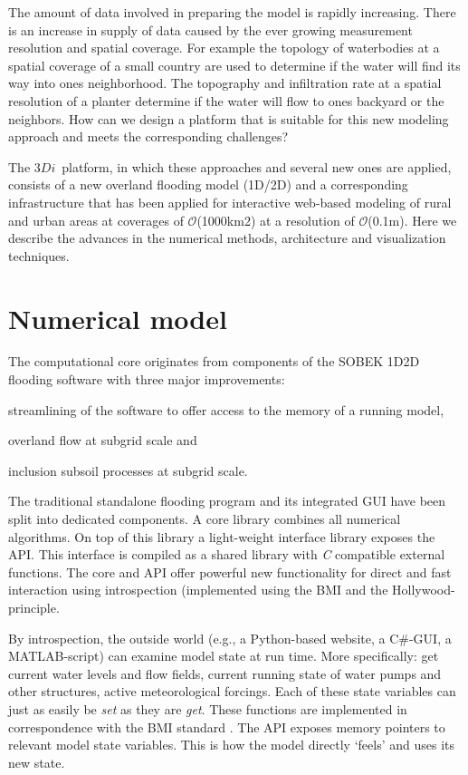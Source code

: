 \documentclass[a4paper]{article}
\DeclareRobustCommand{\orderof}{\ensuremath{\mathcal{O}}}
\DeclareRobustCommand{\threedi}{$3Di$~}
\begin{document}
The amount of data involved in preparing the model is rapidly increasing. There is an increase in supply of data caused by the ever growing measurement resolution and spatial coverage. For example the topology of waterbodies at a spatial coverage of a small country are used to determine if the water will find its way into ones neighborhood. The topography and infiltration rate at a spatial resolution of a planter determine if the water will flow to ones backyard or the neighbors. How can we design a platform that is suitable for this new modeling approach and meets the corresponding challenges?

The \threedi  platform, in which these approaches and several new ones are applied, consists of a new overland flooding model (1D/2D) and a corresponding infrastructure that has been applied for interactive web-based modeling of rural and urban areas at coverages of \orderof(1000km2) at a resolution of \orderof(0.1m). Here we describe the advances in the numerical methods, architecture and visualization techniques.

\section{Numerical model}
The computational core originates from components of the {SOBEK} 1D2D flooding software \citep{Stelling2006} with three major improvements: \begin{inparaenum}
\item streamlining of the software to offer access to the memory of a running model,
\item overland flow at subgrid scale and
\item inclusion subsoil processes at subgrid scale.
\end{inparaenum}

The traditional standalone flooding program and its integrated \ac{GUI} have been split into dedicated components. A core library combines all numerical algorithms. On top of this library a light-weight interface library exposes the \ac{API}. This interface is compiled as a shared library with \emph{C} compatible external functions. The core and \ac{API} offer powerful new functionality for direct and fast interaction using introspection (implemented using the \ac{BMI} and the Hollywood-principle.

By introspection, the outside world (e.g., a Python-based website, a C\#-\ac{GUI}, a MATLAB-script) can examine model state at run time. More specifically: get current water levels and flow fields, current running state of water pumps and other structures, active meteorological forcings. Each of these state variables can just as easily be \emph{set} as they are \emph{get}. These functions are implemented in correspondence with the \ac{BMI} standard \citep{Peckham2013}. The \ac{API} exposes memory pointers to relevant model state variables. This is how the model directly `feels' and uses its new state.
\end{document}
